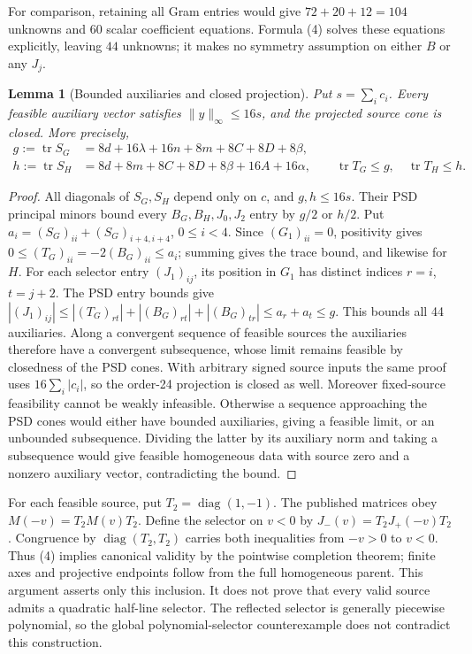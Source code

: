 \documentclass[10pt]{article}
\newtheorem{lemma}{Lemma}
\newcommand{\diag}{\operatorname{diag}}
\begin{document}
For comparison, retaining all Gram entries would give $72+20+12=104$
unknowns and $60$ scalar coefficient equations. Formula (4) solves these
equations explicitly, leaving $44$ unknowns; it makes no symmetry assumption
on either $B$ or any $J_j$.

\begin{lemma}[Bounded auxiliaries and closed projection]
Put $s=\sum_i c_i$. Every feasible auxiliary vector satisfies
$\|y\|_\infty\le16s$, and the projected source cone is closed. More precisely,
\begin{align*}
 g:=\operatorname{tr}S_G&=8d+16\lambda+16n+8m+8C+8D+8\beta,\\
 h:=\operatorname{tr}S_H&=8d+8m+8C+8D+8\beta+16A+16\alpha,
 \qquad \operatorname{tr}T_G\le g,\quad\operatorname{tr}T_H\le h.
\end{align*}
\end{lemma}
\begin{proof}
All diagonals of $S_G,S_H$ depend only on $c$, and $g,h\le16s$.
Their PSD principal minors bound every $B_G,B_H,J_0,J_2$ entry by
$g/2$ or $h/2$. Put $a_i=(S_G)_{ii}+(S_G)_{i+4,i+4}$, $0\le i<4$.
Since $(G_1)_{ii}=0$, positivity gives
$0\le(T_G)_{ii}=-2(B_G)_{ii}\le a_i$; summing gives the trace bound,
and likewise for $H$. For each selector entry $(J_1)_{ij}$, its position
in $G_1$ has distinct indices $r=i$, $t=j+2$. The PSD entry bounds give
$|(J_1)_{ij}|\le |(T_G)_{rt}|+|(B_G)_{rt}|+|(B_G)_{tr}|
\le a_r+a_t\le g$.
This bounds all 44 auxiliaries. Along a convergent sequence of feasible
sources the auxiliaries therefore have a convergent subsequence, whose
limit remains feasible by closedness of the PSD cones. With arbitrary
signed source inputs the same proof uses $16\sum_i|c_i|$, so the order-24
projection is closed as well.
Moreover fixed-source feasibility cannot be weakly infeasible. Otherwise a
sequence approaching the PSD cones would either have bounded auxiliaries,
giving a feasible limit, or an unbounded subsequence. Dividing the latter by
its auxiliary norm and taking a subsequence would give feasible homogeneous
data with source zero and a nonzero auxiliary vector, contradicting the bound.
\end{proof}

For each feasible source, put $T_2=\diag(1,-1)$. The published matrices obey
$M(-v)=T_2M(v)T_2$. Define the selector on $v<0$ by
$J_-(v)=T_2J_+(-v)T_2$. Congruence by $\diag(T_2,T_2)$ carries both
inequalities from $-v>0$ to $v<0$. Thus (4) implies canonical validity by
the pointwise completion theorem; finite axes and projective endpoints
follow from the full homogeneous parent. This argument asserts only this
inclusion. It does not prove that every valid source admits a quadratic
half-line selector. The reflected selector is generally piecewise
polynomial, so the global polynomial-selector counterexample does not
contradict this construction.
\end{document}

